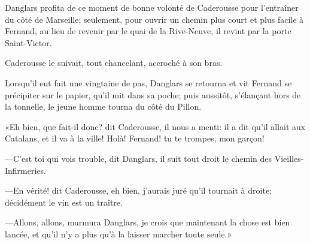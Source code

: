 Danglars profita de ce moment de bonne volonté de Caderousse pour l'entraîner du côté de Marseille; seulement, pour ouvrir un chemin plus court et plus facile à Fernand, au lieu de revenir par le quai de la Rive-Neuve, il revint par la porte Saint-Victor.

Caderousse le suivait, tout chancelant, accroché à son bras.

Lorsqu'il eut fait une vingtaine de pas, Danglars se retourna et vit Fernand se précipiter sur le papier, qu'il mit dans sa poche; puis aussitôt, s'élançant hors de la tonnelle, le jeune homme tourna du côté du Pillon.

«Eh bien, que fait-il donc? dit Caderousse, il nous a menti: il a dit qu'il allait aux Catalans, et il va à la ville! Holà! Fernand! tu te trompes, mon garçon!

—C'est toi qui vois trouble, dit Danglars, il suit tout droit le chemin des Vieilles-Infirmeries.

—En vérité! dit Caderousse, eh bien, j'aurais juré qu'il tournait à droite; décidément le vin est un traître.

—Allons, allons, murmura Danglars, je crois que maintenant la chose est bien lancée, et qu'il n'y a plus qu'à la laisser marcher toute seule.»



